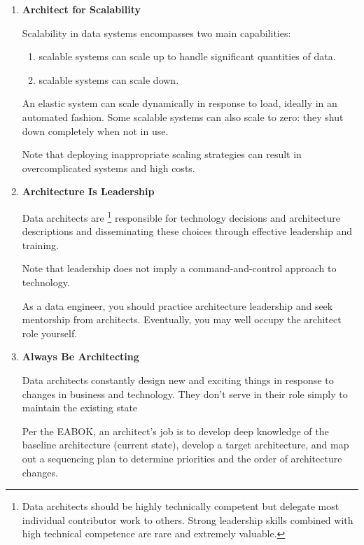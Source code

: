 \begin{enumerate}
    \item \textbf{Architect for Scalability}
    
    \noindent
    Scalability in data systems encompasses two main capabilities:
    \begin{enumerate}
        \item scalable systems can scale up to handle significant
        quantities of data.

        \item scalable systems can scale down.
    \end{enumerate}
    An elastic system can scale dynamically in response to load,
    ideally in an automated fashion. Some scalable systems can also
    scale to zero: they shut down completely when not in use.

    Note that deploying inappropriate scaling strategies can result
    in overcomplicated systems and high costs.


    \item \textbf{Architecture Is Leadership}
    
    \noindent
    Data architects are
    \footnote{
        Data architects should be highly technically competent but
        delegate most individual contributor work to others. Strong
        leadership skills combined with high technical competence are
        rare and extremely valuable.
    }
    responsible for technology decisions and architecture descriptions
    and disseminating these choices through effective leadership and
    training.

    Note that leadership does not imply a command-and-control approach
    to technology.

    As a data engineer, you should practice architecture leadership
    and seek mentorship from architects. Eventually, you may well
    occupy the architect role yourself.


    \item \textbf{Always Be Architecting}
    
    \noindent
    Data architects constantly design new and exciting things in
    response to changes in business and technology. They don't serve
    in their role simply to maintain the existing state
    
    Per the EABOK, an architect's job is to develop deep knowledge of
    the baseline architecture (current state), develop a target
    architecture, and map out a sequencing plan to determine
    priorities and the order of architecture changes.


\end{enumerate}
